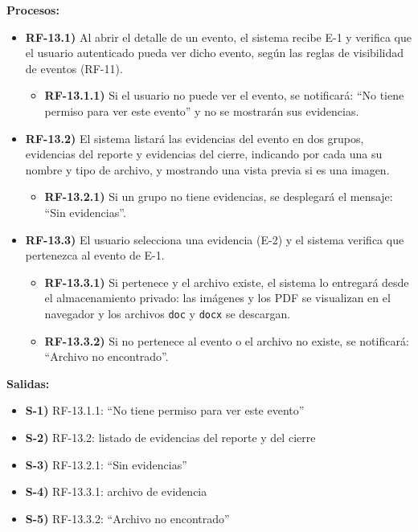 \textbf{Procesos:}
\begin{itemize}[label={}, leftmargin=1.5em]
  \item \textbf{RF-13.1)} Al abrir el detalle de un evento, el sistema recibe E-1 y verifica que el usuario autenticado pueda ver dicho evento, seg\'un las reglas de visibilidad de eventos (RF-11).
  \begin{itemize}[label={}, leftmargin=1.5em]
    \item \textbf{RF-13.1.1)} Si el usuario no puede ver el evento, se notificar\'a: ``No tiene permiso para ver este evento'' y no se mostrar\'an sus evidencias.
  \end{itemize}
  \item \textbf{RF-13.2)} El sistema listar\'a las evidencias del evento en dos grupos, evidencias del reporte y evidencias del cierre, indicando por cada una su nombre y tipo de archivo, y mostrando una vista previa si es una imagen.
  \begin{itemize}[label={}, leftmargin=1.5em]
    \item \textbf{RF-13.2.1)} Si un grupo no tiene evidencias, se desplegar\'a el mensaje: ``Sin evidencias''.
  \end{itemize}
  \item \textbf{RF-13.3)} El usuario selecciona una evidencia (E-2) y el sistema verifica que pertenezca al evento de E-1.
  \begin{itemize}[label={}, leftmargin=1.5em]
    \item \textbf{RF-13.3.1)} Si pertenece y el archivo existe, el sistema lo entregar\'a desde el almacenamiento privado: las im\'agenes y los PDF se visualizan en el navegador y los archivos \texttt{doc} y \texttt{docx} se descargan.
    \item \textbf{RF-13.3.2)} Si no pertenece al evento o el archivo no existe, se notificar\'a: ``Archivo no encontrado''.
  \end{itemize}
\end{itemize}

\textbf{Salidas:}
\begin{itemize}[label={}, leftmargin=1.5em]
  \item \textbf{S-1)} RF-13.1.1: ``No tiene permiso para ver este evento''
  \item \textbf{S-2)} RF-13.2: listado de evidencias del reporte y del cierre
  \item \textbf{S-3)} RF-13.2.1: ``Sin evidencias''
  \item \textbf{S-4)} RF-13.3.1: archivo de evidencia
  \item \textbf{S-5)} RF-13.3.2: ``Archivo no encontrado''
\end{itemize}

